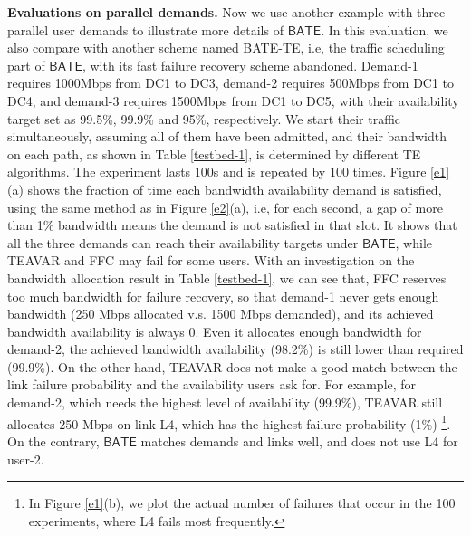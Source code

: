\documentclass[sigconf]{acmart}
\begin{document}
\textbf{Evaluations on parallel demands.}
Now we use another example with three parallel user demands to illustrate more details of $\mathsf{BATE}$. 
In this evaluation, we also compare with another scheme named BATE-TE, i.e, the traffic scheduling part of $\mathsf{BATE}$, with its fast failure recovery scheme abandoned. 
Demand-1 requires 1000Mbps from DC1 to DC3, demand-2 requires  500Mbps from DC1 to DC4, 
and demand-3 requires 1500Mbps from DC1 to DC5, 
with their availability target set as 99.5\%, 99.9\% and 95\%, respectively. 
We start their traffic simultaneously, assuming all of them have been admitted, 
and their bandwidth on each path, as shown in Table \ref{testbed-1}, 
is determined by different TE algorithms. 
The experiment lasts 100s and is repeated by 100 times.
Figure \ref{e1}(a) shows the fraction of time each bandwidth availability demand is satisfied, 
using the same method as in Figure \ref{e2}(a), i.e, for each second, 
a gap of more than 1\% bandwidth means the demand is not satisfied in that slot. 
It shows that all the three demands can reach their availability targets under $\mathsf{BATE}$,
while TEAVAR and FFC may fail for some users. 
With an investigation on the bandwidth allocation result in Table \ref{testbed-1}, 
we can see that, FFC reserves too much bandwidth for failure recovery, 
so that demand-1 never gets enough bandwidth (250 Mbps allocated v.s. 1500 Mbps demanded), 
and its achieved bandwidth availability is always 0. 
Even it allocates enough bandwidth for demand-2, the achieved bandwidth availability (98.2\%)  
is still lower than required (99.9\%). 
On the other hand, TEAVAR does not make a good match between the link failure probability and the availability users ask for. 
For example, for demand-2, which needs the highest level of availability (99.9\%), 
TEAVAR still allocates 250 Mbps on link L4, which has the highest failure probability (1\%) 
\footnote{In Figure \ref{e1}(b), we plot the actual number of failures that occur in the 100 experiments, 
where L4 fails most frequently.}. 
On the contrary, $\mathsf{BATE}$ matches demands and links well, and does not use L4 for user-2.
\end{document}
